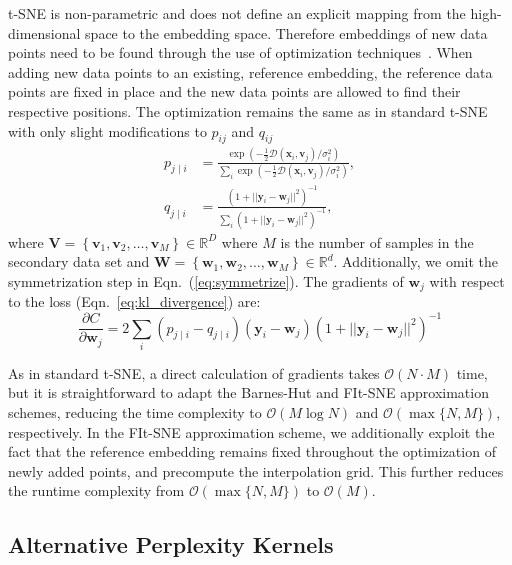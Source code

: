 \documentclass[twocolumn]{bmcart}
\begin{document}
t-SNE is non-parametric and does not define an explicit mapping from the high-dimensional space to the embedding space. Therefore embeddings of new data points need to be found through the use of optimization techniques~\cite{policar2019embedding}. When adding new data points to an existing, reference embedding, the reference data points are fixed in place and the new data points are allowed to find their respective positions. The optimization remains the same as in standard t-SNE with only slight modifications to $p_{ij}$ and $q_{ij}$
\begin{align}
p_{j \mid i} &= \frac{\exp \left ( -\frac{1}{2} \mathcal{D}(\mathbf{x}_i, \mathbf{v}_j) /  \sigma_i^2 \right )}{\sum_{i} \exp \left ( -\frac{1}{2} \mathcal{D}(\mathbf{x}_i, \mathbf{v}_j) / \sigma_i^2 \right )}, \\
q_{j \mid i} &= \frac{\left ( 1 + || \mathbf{y}_i - \mathbf{w}_j ||^2 \right )^{-1}}{\sum_{i}\left ( 1 + || \mathbf{y}_i - \mathbf{w}_j ||^2 \right )^{-1}},
\end{align}
\noindent where $\mathbf{V} = \left \{ \mathbf{v}_1, \mathbf{v}_2, \dots,
\mathbf{v}_M \right \} \in \mathbb{R}^D$ where $M$ is the number of samples in
the secondary data set and $\mathbf{W} = \left \{ \mathbf{w}_1, \mathbf{w}_2, \dots,
\mathbf{w}_M \right \} \in \mathbb{R}^d$. Additionally, we omit the
symmetrization step in Eqn.~(\ref{eq:symmetrize}). The gradients of
$\mathbf{w}_j$ with respect to the loss (Eqn.~\ref{eq:kl_divergence}) are:
\begin{equation}
\frac{\partial C}{\partial \mathbf{w}_j} = 2 \sum_i \left ( p_{j \mid i} - q_{j \mid i} \right ) \left ( \mathbf{y}_i - \mathbf{w}_j \right ) \left ( 1 + || \mathbf{y}_i - \mathbf{w}_j || ^2 \right )^{-1}
\label{eq:gradient}
\end{equation}

As in standard t-SNE, a direct calculation of gradients takes $\mathcal{O}(N \cdot M)$ time, but it is straightforward to adapt the Barnes-Hut and FIt-SNE approximation schemes, reducing the time complexity to $\mathcal{O}(M \log N)$ and $\mathcal{O}(\max \{ N, M \})$, respectively. In the FIt-SNE approximation scheme, we additionally exploit the fact that the reference embedding remains fixed throughout the optimization of newly added points, and precompute the interpolation grid. This further reduces the runtime complexity from $\mathcal{O}(\max \{ N, M \})$ to $\mathcal{O}(M)$.

\subsection*{Alternative Perplexity Kernels}
\end{document}
